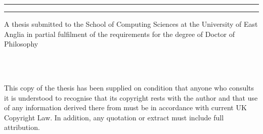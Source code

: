 %
% 
% 
%
%
%
%
%
%

%
%


\thispagestyle{empty}
\begin{titlepage}
\begin{center}
\hrule
\vspace{1.5em}
\Huge\textbf{\DocTitle}\par
\vspace{1em}
\hrule
\vspace{0.5in}

\Large{A thesis submitted to the School of Computing Sciences at the University of East Anglia in partial fulfilment of the requirements for the degree of Doctor of Philosophy}\par

\vspace{0.5in}

\LARGE{\AuthorName\\ \Large{\SubmissionMonth\ \SubmissionYear}}\par
\vspace{0.2in}
\end{center}


 This copy of the thesis has been supplied on condition that anyone who consults it is understood to recognise 
that its copyright rests with the author and that use of any information derived there from must be in accordance 
with current UK Copyright Law. In addition, any quotation or extract must include full attribution.

\end{titlepage}

